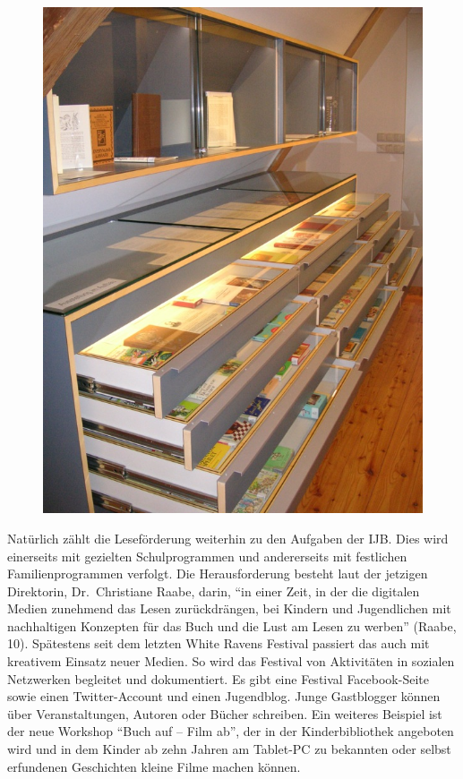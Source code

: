 \documentclass[a4paper,
fontsize=11pt,
oneside,
numbers=noperiodatend,
parskip=half-,
bibliography=totoc,
final
]{scrartcl}
\begin{document}
\begin{figure}[htbp]
\centering
\includegraphics{img/bild29.jpg}
\end{figure}

Natürlich zählt die Leseförderung weiterhin zu den Aufgaben der IJB.
Dies wird einerseits mit gezielten Schulprogrammen und andererseits mit
festlichen Familienprogrammen verfolgt. Die Herausforderung besteht laut
der jetzigen Direktorin, Dr.~Christiane Raabe, darin, \enquote{in einer
Zeit, in der die digitalen Medien zunehmend das Lesen zurückdrängen, bei
Kindern und Jugendlichen mit nachhaltigen Konzepten für das Buch und die
Lust am Lesen zu werben} (Raabe, 10). Spätestens seit dem letzten White
Ravens Festival passiert das auch mit kreativem Einsatz neuer Medien. So
wird das Festival von Aktivitäten in sozialen Netzwerken begleitet und
dokumentiert. Es gibt eine Festival Facebook-Seite sowie einen
Twitter-Account und einen Jugendblog. Junge Gastblogger können über
Veranstaltungen, Autoren oder Bücher schreiben. Ein weiteres Beispiel
ist der neue Workshop \enquote{Buch auf -- Film ab}, der in der
Kinderbibliothek angeboten wird und in dem Kinder ab zehn Jahren am
Tablet-PC zu bekannten oder selbst erfundenen Geschichten kleine Filme
machen können.
\end{document}
